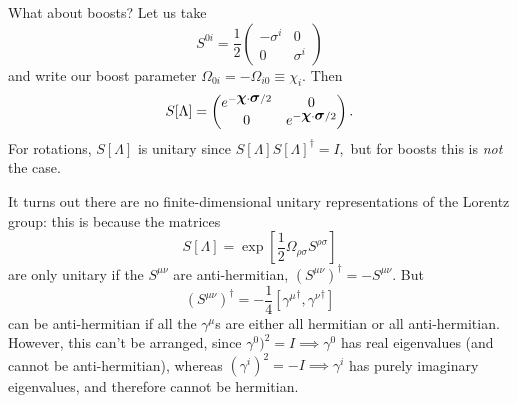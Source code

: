 What about boosts? Let us take
$$S^{0i}=\frac{1}{2}\begin{pmatrix}
-\sigma^i & 0\\
0&\sigma^i
\end{pmatrix}$$
and write our boost parameter $\Omega_{0i}=-\Omega_{i0}\equiv \chi_i.$ Then
$$S[\Lambda]=\begin{pmatrix}
e^{-\mbox{\boldmath$ \chi $} \cdot \mbox{\boldmath$ \sigma $}/2} & 0\\
0&e^{-\mbox{\boldmath$ \chi $} \cdot \mbox{\boldmath$ \sigma $}/2}
\end{pmatrix}.$$
For rotations, $S[\Lambda]$ is unitary since $S[\Lambda]S[\Lambda]^\dagger =I,$ but for boosts this is \emph{not} the case.

It turns out there are no finite-dimensional unitary representations of the Lorentz group: this is because the matrices
$$S[\Lambda]=\exp\left[\frac{1}{2}\Omega_{\rho\sigma} S^{\rho\sigma}\right]$$ are only unitary if the $S^{\mu\nu}$ are anti-hermitian, $(S^{\mu\nu})^\dagger=-S^{\mu\nu}.$ But
$$(S^{\mu\nu})^\dagger=-\frac{1}{4}[{\gamma^\mu}^\dagger,{\gamma^\nu}^\dagger]$$
can be anti-hermitian if all the $\gamma^\mu$s are either all hermitian or all anti-hermitian. However, this can't be arranged, since
$\gamma^0)^2=I\implies \gamma^0$ has real eigenvalues (and cannot be anti-hermitian), whereas $(\gamma^i)^2=-I\implies \gamma^i$ has purely imaginary eigenvalues, and therefore cannot be hermitian.